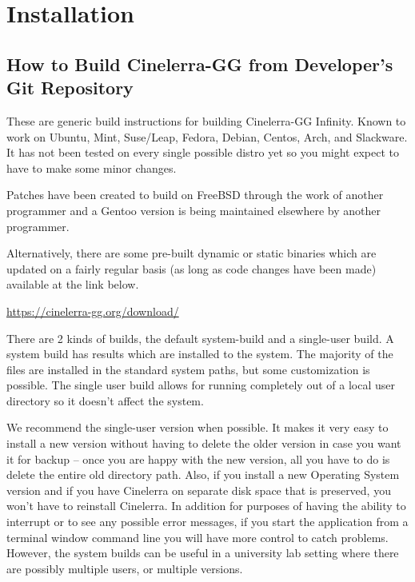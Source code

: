 \chapter{Installation}
\label{cha:Installation}
\section{How to Build Cinelerra-GG from Developer's Git Repository}%
\label{sec:How_to_build}

These are generic build instructions for building Cinelerra-GG Infinity.  
Known to work on Ubuntu, Mint, Suse/Leap, Fedora, Debian, Centos, Arch, and Slackware.  
It has not been tested on every single possible distro yet so you might expect to have to make some minor changes.

Patches have been created to build on FreeBSD through the work of another programmer and a Gentoo version is being maintained elsewhere by another programmer.

Alternatively, there are some pre-built dynamic or static binaries which are updated on a fairly regular basis (as long as code changes have been made) available at the link below.

\begin{center}
	{\small \url{https://cinelerra-gg.org/download/}}
\end{center}

There are 2 kinds of builds, the default system-build and a single-user build.  
A system build has results which are installed to the system. 
The majority of the files are installed in the standard system paths, but some customization is possible. 
The single user build allows for running completely out of a local user directory so it doesn't affect the system.

We recommend the single-user version when possible.  
It makes it very easy to install a new version without having to delete the older version in case you want it for backup -- once you are happy with the new version, all you have to do is delete the entire old directory path.  
Also, if you install a new Operating System version and if you have Cinelerra on separate disk space that is preserved, you won't have to reinstall Cinelerra.  
In addition for purposes of having the ability to interrupt or to see any possible error messages, if you start the application from a terminal window command line you will have more control to catch problems.  
However, the system builds can be useful in a university lab setting where there are possibly multiple users, or multiple versions.

